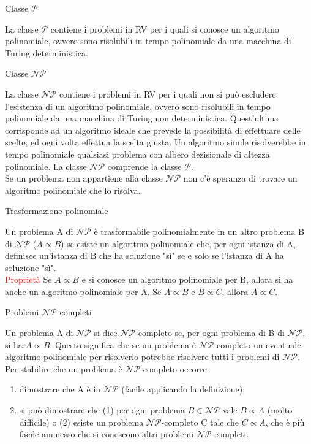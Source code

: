 \documentclass[answers, a4paper, 11pt]{exam}
\begin{document}
\begin{questions}
\begin{solution}
\end{solution}
\question Classe $\mathcal{P}$
\begin{solution}
La classe $\mathcal{P}$ contiene i problemi in RV per i quali si conosce un algoritmo polinomiale, ovvero sono risolubili in tempo polinomiale da una macchina di Turing deterministica. 
\end{solution}
\question Classe $\mathcal{NP}$
\begin{solution}
La classe $\mathcal{NP}$ contiene i problemi in RV per i quali non si può escludere l'esistenza di un algoritmo polinomiale, ovvero sono risolubili in tempo polinomiale da una macchina di Turing non deterministica. Quest'ultima corrisponde ad un algoritmo ideale che prevede la possibilità di effettuare delle scelte, ed ogni volta effettua la scelta giusta. Un algoritmo simile risolverebbe in tempo polinomiale qualsiasi problema con albero dezisionale di altezza polinomiale. La classe $\mathcal{NP}$ comprende la classe $\mathcal{P}$.\\
Se un problema non appartiene alla classe $\mathcal{NP}$ non c'è speranza di trovare un algoritmo polinomiale che lo risolva.
\end{solution}
\question Trasformazione polinomiale
\begin{solution}
Un problema A di $\mathcal{NP}$ è trasformabile polinomialmente in un altro problema B di $\mathcal{NP}$ ($A \propto B$) se esiste un algoritmo polinomiale  che, per ogni istanza di A, definisce un'istanza di B che ha soluzione "sì" se e solo se l'istanza di A ha soluzione "sì".\\
\textcolor{red}{Proprietà} Se $A \propto B$ e si conosce un algoritmo polinomiale per B, allora si ha anche un algoritmo polinomiale per A. Se $A \propto B$ e $B \propto C$, allora $A \propto C$. 
\end{solution}
\question Problemi $\mathcal{NP}$-completi
\begin{solution}
Un problema A di $\mathcal{NP}$ si dice $\mathcal{NP}$-completo se, per ogni problema di B di $\mathcal{NP}$, si ha $A \propto B$. Questo significa che se un problema è $\mathcal{NP}$-completo un eventuale algoritmo polinomiale per risolverlo potrebbe risolvere tutti i problemi di $\mathcal{NP}$.\\
Per stabilire che un problema è $\mathcal{NP}$-completo occorre:
\begin{enumerate}
\item dimostrare che A è in $\mathcal{NP}$ (facile applicando la definizione);
\item si può dimostrare che (1) per ogni problema $B \in \mathcal{NP}$ vale $B \propto A$ (molto difficile) o (2) esiste un problema $\mathcal{NP}$-completo C tale che $C \propto A$, che è più facile ammesso che si conoscono altri problemi $\mathcal{NP}$-completi.

\end{enumerate}
\end{solution}
\end{questions}
\end{document}
